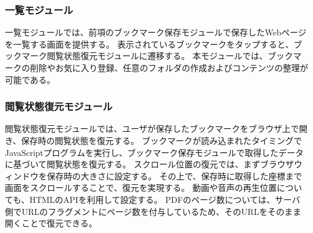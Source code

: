 \subsubsection{一覧モジュール}
一覧モジュールでは、前項のブックマーク保存モジュールで保存したWebページを一覧する画面を提供する。
表示されているブックマークをタップすると、ブックマーク閲覧状態復元モジュールに遷移する。
本モジュールでは、ブックマークの削除やお気に入り登録、任意のフォルダの作成およびコンテンツの整理が可能である。

\subsubsection{閲覧状態復元モジュール}
閲覧状態復元モジュールでは、ユーザが保存したブックマークをブラウザ上で開き、保存時の閲覧状態を復元する。
ブックマークが読み込まれたタイミングでJavaScriptプログラムを実行し、ブックマーク保存モジュールで取得したデータに基づいて閲覧状態を復元する。
スクロール位置の復元では、まずブラウザウィンドウを保存時の大きさに設定する。
その上で、保存時に取得した座標まで画面をスクロールすることで、復元を実現する。
動画や音声の再生位置についても、HTMLのAPIを利用して設定する。
PDFのページ数については、サーバ側でURLのフラグメントにページ数を付与しているため、そのURLをそのまま開くことで復元できる。
